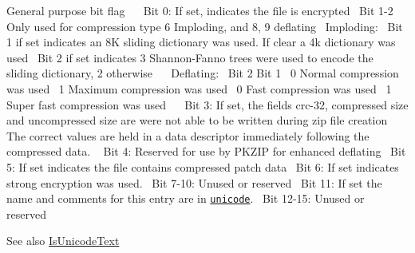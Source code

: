 General purpose bit flag~\newline
 ~\newline
 Bit 0\+: If set, indicates the file is encrypted~\newline
 Bit 1-\/2 Only used for compression type 6 Imploding, and 8, 9 deflating~\newline
 Imploding\+:~\newline
 Bit 1 if set indicates an 8K sliding dictionary was used. If clear a 4k dictionary was used~\newline
 Bit 2 if set indicates 3 Shannon-\/\+Fanno trees were used to encode the sliding dictionary, 2 otherwise~\newline
 ~\newline
 Deflating\+:~\newline
 Bit 2 Bit 1~ 0 Normal compression was used~ 1 Maximum compression was used~ 0 Fast compression was used~ 1 Super fast compression was used~\newline
 ~\newline
 Bit 3\+: If set, the fields crc-\/32, compressed size and uncompressed size are were not able to be written during zip file creation The correct values are held in a data descriptor immediately following the compressed data. ~\newline
 Bit 4\+: Reserved for use by P\+K\+Z\+IP for enhanced deflating~\newline
 Bit 5\+: If set indicates the file contains compressed patch data~\newline
 Bit 6\+: If set indicates strong encryption was used.~\newline
 Bit 7-\/10\+: Unused or reserved~\newline
 Bit 11\+: If set the name and comments for this entry are in \href{http://www.unicode.org}{\tt unicode}.~\newline
 Bit 12-\/15\+: Unused or reserved~\newline
 

\begin{DoxySeeAlso}{See also}
\hyperlink{class_i_c_sharp_code_1_1_sharp_zip_lib_1_1_zip_1_1_zip_entry_aa32b0c96d285080ccdd80db5bb22e73c}{Is\+Unicode\+Text}


\end{DoxySeeAlso}


